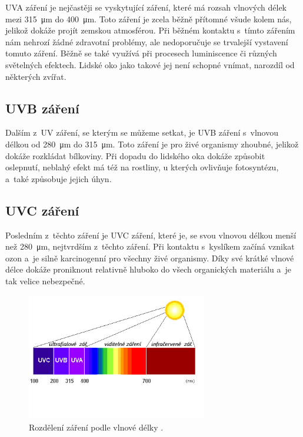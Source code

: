UVA záření je nejčastěji se vyskytující záření, které má rozsah vlnových délek mezi \SI{315}{\micro\metre} do \SI{400}{\micro\metre}. Toto záření je zcela běžně přítomné všude kolem nás, jelikož dokáže projít zemskou atmosférou. Při běžném kontaktu s~tímto zářením nám nehrozí žádné zdravotní problémy, ale nedoporučuje se trvalejší vystavení tomuto záření. Běžně se také využívá při procesech luminiscence či různých světelných efektech. Lidské oko jako takové jej není schopné vnímat, narozdíl od některých zvířat.

\subsection{UVB záření}

Dalším z~UV záření, se kterým se můžeme setkat, je UVB záření s~vlnovou délkou od \SI{280}{\micro\metre} do \SI{315}{\micro\metre}. Toto záření je pro živé organismy zhoubné, jelikož dokáže rozkládat bílkoviny. Při dopadu do lidského oka dokáže způsobit oslepnutí, neblahý efekt má též na rostliny, u kterých ovlivňuje fotosyntézu, a~také způsobuje jejich úhyn.

\subsection{UVC záření}

Posledním z~těchto záření je UVC záření, které je, se svou vlnovou délkou menší než \SI{280}{\micro\metre}, nejtvrdším z~těchto záření. Při kontaktu s~kyslíkem začíná vznikat ozon a~je silně karcinogenní pro všechny živé organismy. Díky své krátké vlnové délce dokáže proniknout relativně hluboko do všech organických materiálu a~je tak velice nebezpečné. \cite{teor_UVMeas}

\begin{figure}
    \centering
    \includegraphics[width=0.7\textwidth]{obrazky/uv_light.jpg}
    \caption[Rozdělení záření podle vlnové délky.]{Rozdělení záření podle vlnové délky \cite{picture_UVLight}.}
    \label{fig_UVLight}
\end{figure}

